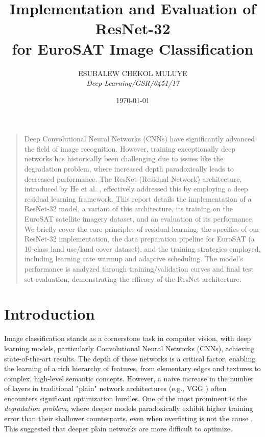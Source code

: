 \documentclass[11pt, a4paper]{article}
\title{\textbf{Implementation and Evaluation of ResNet-32\\ for EuroSAT Image Classification}}
\author{ESUBALEW CHEKOL MULUYE \\ \textit{Deep Learning/GSR/6451/17}} %
\date{\today}
\renewenvironment{abstract}
  {\begin{center}\large\bfseries\color{secondary}\abstractname\end{center}\vspace{0.5em} %
   \begin{quotation}\small\color{darktext}\noindent} %
  {\end{quotation}}
\begin{document}
\begin{titlingpage}
    \maketitle
    \begin{abstract}
    Deep Convolutional Neural Networks (CNNs) have significantly advanced the field of image recognition. However, training exceptionally deep networks has historically been challenging due to issues like the degradation problem, where increased depth paradoxically leads to decreased performance. The ResNet (Residual Network) architecture, introduced by He et al. \cite{he2015deepresiduallearningimage}, effectively addressed this by employing a deep residual learning framework. This report details the implementation of a ResNet-32 model, a variant of this architecture, its training on the EuroSAT satellite imagery dataset, and an evaluation of its performance. We briefly cover the core principles of residual learning, the specifics of our ResNet-32 implementation, the data preparation pipeline for EuroSAT (a 10-class land use/land cover dataset), and the training strategies employed, including learning rate warmup and adaptive scheduling. The model's performance is analyzed through training/validation curves and final test set evaluation, demonstrating the efficacy of the ResNet architecture.
    \end{abstract}
    \vfill
\end{titlingpage}

\clearpage
\tableofcontents
\clearpage

\section{Introduction}
Image classification stands as a cornerstone task in computer vision, with deep learning models, particularly Convolutional Neural Networks (CNNs), achieving state-of-the-art results. The depth of these networks is a critical factor, enabling the learning of a rich hierarchy of features, from elementary edges and textures to complex, high-level semantic concepts. However, a naive increase in the number of layers in traditional "plain" network architectures (e.g., VGG \cite{Simonyan15}) often encounters significant optimization hurdles. One of the most prominent is the \textit{degradation problem}, where deeper models paradoxically exhibit higher training error than their shallower counterparts, even when overfitting is not the cause \cite{he2015deepresiduallearningimage}. This suggested that deeper plain networks are more difficult to optimize.
\end{document}
